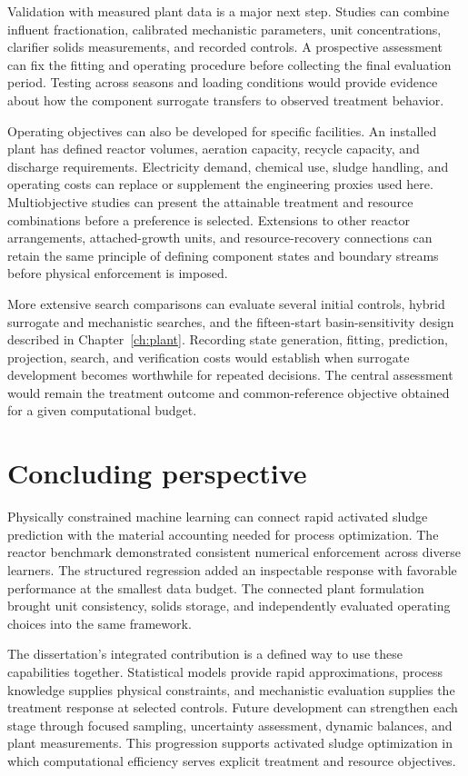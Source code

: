 Validation with measured plant data is a major next step. Studies can combine influent fractionation, calibrated mechanistic parameters, unit concentrations, clarifier solids measurements, and recorded controls. A prospective assessment can fix the fitting and operating procedure before collecting the final evaluation period. Testing across seasons and loading conditions would provide evidence about how the component surrogate transfers to observed treatment behavior.

Operating objectives can also be developed for specific facilities. An installed plant has defined reactor volumes, aeration capacity, recycle capacity, and discharge requirements. Electricity demand, chemical use, sludge handling, and operating costs can replace or supplement the engineering proxies used here. Multiobjective studies can present the attainable treatment and resource combinations before a preference is selected. Extensions to other reactor arrangements, attached-growth units, and resource-recovery connections can retain the same principle of defining component states and boundary streams before physical enforcement is imposed.

More extensive search comparisons can evaluate several initial controls, hybrid surrogate and mechanistic searches, and the fifteen-start basin-sensitivity design described in Chapter~\ref{ch:plant}. Recording state generation, fitting, prediction, projection, search, and verification costs would establish when surrogate development becomes worthwhile for repeated decisions. The central assessment would remain the treatment outcome and common-reference objective obtained for a given computational budget.

\section{Concluding perspective}

Physically constrained machine learning can connect rapid activated sludge prediction with the material accounting needed for process optimization. The reactor benchmark demonstrated consistent numerical enforcement across diverse learners. The structured regression added an inspectable response with favorable performance at the smallest data budget. The connected plant formulation brought unit consistency, solids storage, and independently evaluated operating choices into the same framework.

The dissertation's integrated contribution is a defined way to use these capabilities together. Statistical models provide rapid approximations, process knowledge supplies physical constraints, and mechanistic evaluation supplies the treatment response at selected controls. Future development can strengthen each stage through focused sampling, uncertainty assessment, dynamic balances, and plant measurements. This progression supports activated sludge optimization in which computational efficiency serves explicit treatment and resource objectives.
